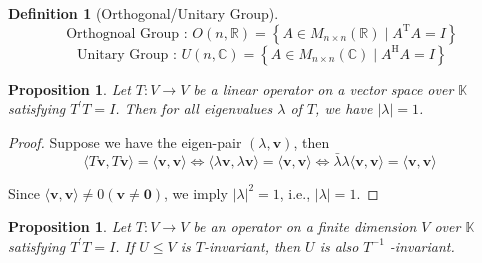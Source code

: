 \documentclass[11pt]{article}
\newtheorem{definition}[theorem]{Definition}
\newtheorem{proposition}[theorem]{Proposition}
\begin{document}
\begin{definition}[Orthogonal/Unitary Group]
\[
\text{ Orthognoal Group : }O\left( {n,\mathbb{R}}\right)  = \left\{  {A \in  {M}_{n \times  n}\left( \mathbb{R}\right)  \mid  {A}^{\mathrm{T}}A = I}\right\}
\]
\[
\text{ Unitary Group : }U\left( {n,\mathbb{C}}\right)  = \left\{  {A \in  {M}_{n \times  n}\left( \mathbb{C}\right)  \mid  {A}^{\mathrm{H}}A = I}\right\}
\]
\end{definition}


\begin{proposition} Let \(T : V \rightarrow  V\) be a linear operator on a vector space over \(\mathbb{K}\) satisfying \({T}^{\prime }T = I\). Then for all eigenvalues \(\lambda\) of \(T\), we have \(\left| \lambda \right|  = 1\).
\end{proposition}

\begin{proof} Suppose we have the eigen-pair \(\left( {\lambda ,\mathbf{v}}\right)\), then
\[
\langle T\mathbf{v},T\mathbf{v}\rangle  = \langle \mathbf{v},\mathbf{v}\rangle \Leftrightarrow  \langle \lambda \mathbf{v},\lambda \mathbf{v}\rangle  = \langle \mathbf{v},\mathbf{v}\rangle
\Leftrightarrow  \bar{\lambda }\lambda \langle \mathbf{v},\mathbf{v}\rangle  = \langle \mathbf{v},\mathbf{v}\rangle
\]

Since \(\langle \mathbf{v},\mathbf{v}\rangle  \neq  0\left( {\mathbf{v} \neq  \mathbf{0}}\right)\), we imply \({\left| \lambda \right| }^2 = 1\), i.e., \(\left| \lambda \right|  = 1\).
\end{proof}

\begin{proposition} Let \(T : V \rightarrow  V\) be an operator on a finite dimension \(V\) over \(\mathbb{K}\) satisfying \({T}^{\prime }T = I\). If \(U \leq  V\) is \(T\)-invariant, then \(U\) is also \({T}^{-1}\) -invariant.
\end{proposition}
\end{document}
